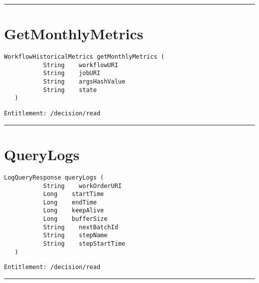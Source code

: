 \rule{12cm}{2pt}
\section{GetMonthlyMetrics}
\label{Api:GetMonthlyMetrics}
\begin{lstlisting}[style=nonumbers]
   WorkflowHistoricalMetrics getMonthlyMetrics (
           String    workflowURI
           String    jobURI
           String    argsHashValue
           String    state
   )
\end{lstlisting}
\begin{Verbatim}[formatcom=\color{Maroon}]
  Entitlement: /decision/read
\end{Verbatim}



\rule{12cm}{2pt}
\section{QueryLogs}
\label{Api:QueryLogs}
\begin{lstlisting}[style=nonumbers]
   LogQueryResponse queryLogs (
           String    workOrderURI
           Long    startTime
           Long    endTime
           Long    keepAlive
           Long    bufferSize
           String    nextBatchId
           String    stepName
           String    stepStartTime
   )
\end{lstlisting}
\begin{Verbatim}[formatcom=\color{Maroon}]
  Entitlement: /decision/read
\end{Verbatim}



\rule{12cm}{2pt}
